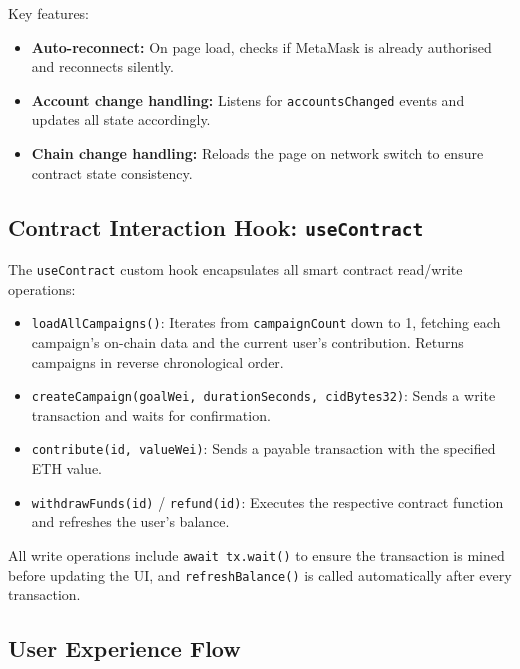 Key features:
\begin{itemize}[leftmargin=1.5em]
    \item \textbf{Auto-reconnect:} On page load, checks if MetaMask is already authorised and reconnects silently.
    \item \textbf{Account change handling:} Listens for \texttt{accountsChanged} events and updates all state accordingly.
    \item \textbf{Chain change handling:} Reloads the page on network switch to ensure contract state consistency.
\end{itemize}

\subsection{Contract Interaction Hook: \texttt{useContract}}

The \texttt{useContract} custom hook encapsulates all smart contract read/write operations:

\begin{itemize}[leftmargin=1.5em]
    \item \texttt{loadAllCampaigns()}: Iterates from \texttt{campaignCount} down to 1, fetching each campaign's on-chain data and the current user's contribution. Returns campaigns in reverse chronological order.
    \item \texttt{createCampaign(goalWei, durationSeconds, cidBytes32)}: Sends a write transaction and waits for confirmation.
    \item \texttt{contribute(id, valueWei)}: Sends a payable transaction with the specified ETH value.
    \item \texttt{withdrawFunds(id)} / \texttt{refund(id)}: Executes the respective contract function and refreshes the user's balance.
\end{itemize}

All write operations include \texttt{await tx.wait()} to ensure the transaction is mined before updating the UI, and \texttt{refreshBalance()} is called automatically after every transaction.

\subsection{User Experience Flow}

